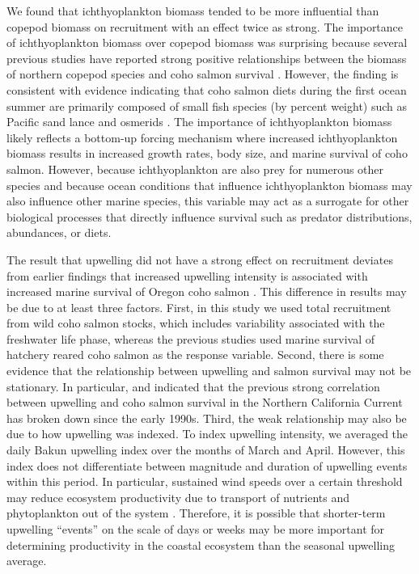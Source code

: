 We found that ichthyoplankton biomass tended to be more influential than copepod
biomass on recruitment with an effect twice as strong. The importance of
ichthyoplankton biomass over copepod biomass was surprising because several
previous studies have reported strong positive relationships between the biomass
of northern copepod species and coho salmon survival \citep{Bi2011a,
Ruzicka2011, Peterson2003b}.  However, the finding is consistent with evidence
indicating that coho salmon diets during the first ocean summer are primarily
composed of small fish species (by percent weight) such as Pacific sand lance
and osmerids \citep{Brodeur2007a, Weitkamp2008a}. The importance of
ichthyoplankton biomass likely reflects a bottom-up forcing mechanism where
increased ichthyoplankton biomass results in increased growth rates, body size,
and marine survival of coho salmon. However, because ichthyoplankton are also
prey for numerous other species \citep{Gladics2014, Miller2010, Miller2007} and
because ocean conditions that influence ichthyoplankton biomass may also
influence other marine species, this variable may act as a surrogate for other
biological processes that directly influence survival such as predator
distributions, abundances, or diets.

The result that upwelling did not have a strong effect on recruitment deviates
from earlier findings that increased upwelling intensity is associated with
increased marine survival of Oregon coho salmon \citep{Fisher1988a,
Logerwell2003a}. This difference in results may be due to at least three
factors. First, in this study we used total recruitment from wild coho salmon
stocks, which includes variability associated with the freshwater life phase,
whereas the previous studies used marine survival of hatchery reared coho salmon
as the response variable. Second, there is some evidence that the relationship
between upwelling and salmon survival may not be stationary. In particular,
\citet{Botsford2002} and \citet{Pearcy1997} indicated that the previous strong
correlation between upwelling and coho salmon survival in the Northern
California Current has broken down since the early 1990s.  Third, the weak
relationship may also be due to how upwelling was indexed. To index upwelling
intensity, we averaged the daily Bakun upwelling index over the months of March
and April. However, this index does not differentiate between magnitude and
duration of upwelling events within this period. In particular, sustained wind
speeds over a certain threshold may reduce ecosystem productivity due to
transport of nutrients and phytoplankton out of the system \citep{Botsford2006,
Botsford2003}. Therefore, it is possible that shorter-term upwelling ``events''
on the scale of days or weeks may be more important for determining productivity
in the coastal ecosystem than the seasonal upwelling average.

